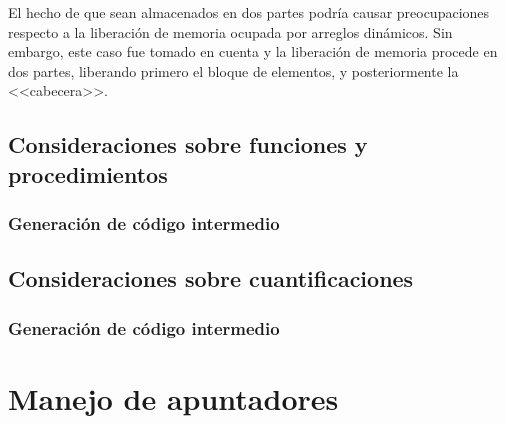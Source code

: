 El hecho de que sean almacenados en dos partes podría causar preocupaciones
respecto a la liberación de memoria ocupada por arreglos dinámicos. Sin embargo,
este caso fue tomado en cuenta y la liberación de memoria procede en dos partes,
liberando primero el bloque de elementos, y posteriormente la <<cabecera>>.

\subsection{Consideraciones sobre funciones y procedimientos}
\blindtext[1]
\subsubsection{Generación de código intermedio}

\subsection{Consideraciones sobre cuantificaciones}
\blindtext[1]

\subsubsection{Generación de código intermedio}

\section{Manejo de apuntadores}
\blindtext[1]

